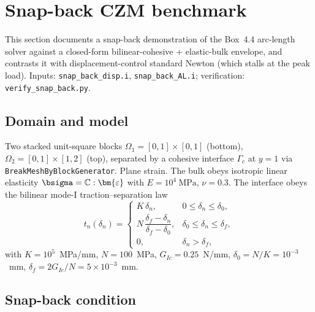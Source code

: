 \section{Snap-back CZM benchmark}
\label{sec:snap_back_czm}

This section documents a snap-back demonstration of the Box~4.4 arc-length
solver against a closed-form bilinear-cohesive + elastic-bulk envelope, and
contrasts it with displacement-control standard Newton (which stalls at the
peak load). Inputs:
\texttt{snap\_back\_disp.i}, \texttt{snap\_back\_AL.i};
verification: \texttt{verify\_snap\_back.py}.

\subsection{Domain and model}

Two stacked unit-square blocks $\Omega_1 = [0,1]\times[0,1]$ (bottom),
$\Omega_2 = [0,1]\times[1,2]$ (top), separated by a cohesive interface
$\Gamma_c$ at $y=1$ via \texttt{BreakMeshByBlockGenerator}. Plane strain.
The bulk obeys isotropic linear elasticity $\bsigma = \mathbb{C}:\bm{\varepsilon}$
with $E = 10^{4}~\text{MPa}$, $\nu = 0.3$. The interface obeys the bilinear
mode-I traction--separation law
\begin{equation}
t_n(\delta_n) =
\begin{cases}
K\,\delta_n,                                            & 0 \le \delta_n \le \delta_0, \\[4pt]
N\,\dfrac{\delta_f - \delta_n}{\delta_f - \delta_0},   & \delta_0 \le \delta_n \le \delta_f, \\[8pt]
0,                                                      & \delta_n > \delta_f,
\end{cases}
\end{equation}
with $K = 10^{5}$~MPa/mm, $N = 100$~MPa, $G_{Ic} = 0.25$~N/mm,
$\delta_0 = N/K = 10^{-3}$~mm, $\delta_f = 2 G_{Ic}/N = 5\times 10^{-3}$~mm.

\subsection{Snap-back condition}

